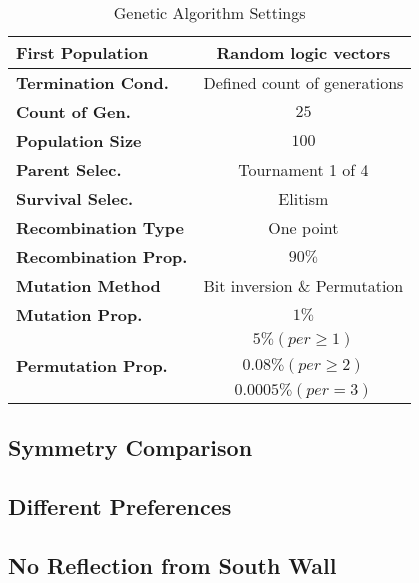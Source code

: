 \begin{table}[htb]
	\renewcommand{\arraystretch}{1.3}
	\caption{Genetic Algorithm Settings}
 	\label{tab:GAsettings}
	\centering
  \begin{tabular}{| l | c |}
    \hline
    \textbf{First Population} & Random logic vectors \\
    \hline
    \textbf{Termination Cond.} & Defined count of generations \\
    \hline
		\textbf{Count of Gen.} & $25$ \\
    \hline
		\textbf{Population Size} & $100$ \\
	\hline
		\textbf{Parent Selec.} & Tournament 1 of 4 \\
    \hline
		\textbf{Survival Selec.} & Elitism \\
	\hline
		\textbf{Recombination Type} & One point \\
    \hline
		\textbf{Recombination Prop.} & $90 \%$ \\
	\hline
		\textbf{Mutation Method} & Bit inversion \& Permutation\\
	\hline
		\textbf{Mutation Prop.} & $1 \%$ \\
	\hline
		& $5 \% \left( per \geq 1\right)$\\
		\textbf{Permutation Prop.} &  $0.08 \% \left( per \geq 2\right)$ \\
		&$0.0005 \% \left( per = 3\right)$\\
    \hline
  \end{tabular}
\end{table}

\subsection{Symmetry Comparison}

\subsection{Different Preferences}

\subsection{No Reflection from South Wall}
